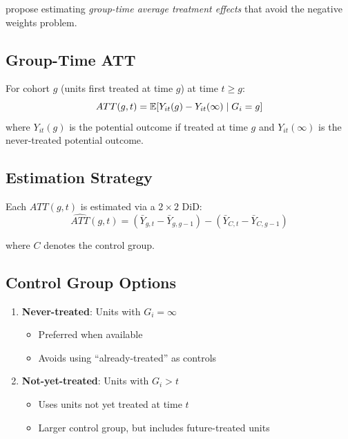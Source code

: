 \citet{callaway2021difference} propose estimating \emph{group-time average treatment effects} that avoid the negative weights problem.

\subsection{Group-Time ATT}

\begin{definition}
For cohort $g$ (units first treated at time $g$) at time $t \geq g$:
\begin{equation}
ATT(g, t) = \mathbb{E}[Y_{it}(g) - Y_{it}(\infty) \mid G_i = g]
\end{equation}
where $Y_{it}(g)$ is the potential outcome if treated at time $g$ and $Y_{it}(\infty)$ is the never-treated potential outcome.
\end{definition}

\subsection{Estimation Strategy}

Each $ATT(g, t)$ is estimated via a $2 \times 2$ DiD:
\begin{equation}
\widehat{ATT}(g, t) = \left(\bar{Y}_{g,t} - \bar{Y}_{g,g-1}\right) - \left(\bar{Y}_{C,t} - \bar{Y}_{C,g-1}\right)
\label{eq:cs_att}
\end{equation}

where $C$ denotes the control group.

\subsection{Control Group Options}

\begin{enumerate}
    \item \textbf{Never-treated}: Units with $G_i = \infty$
    \begin{itemize}
        \item Preferred when available
        \item Avoids using ``already-treated'' as controls
    \end{itemize}
    \item \textbf{Not-yet-treated}: Units with $G_i > t$
    \begin{itemize}
        \item Uses units not yet treated at time $t$
        \item Larger control group, but includes future-treated units
    \end{itemize}
\end{enumerate}

